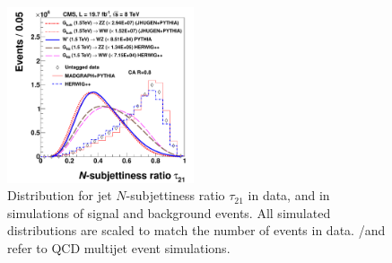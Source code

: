 \begin{figure}[th!b]
\centering
\includegraphics[width=0.49\textwidth]{EventSelectionFigures/signal-data-qcd-Jet-Tau21.pdf}
  \caption{Distribution for jet
   $N$-subjettiness ratio $\tau_{21}$ in data, and in simulations
   of signal and background events. All simulated distributions are
   scaled to match the number of events in data. \MADGRAPH/\PYTHIA and
   \HERWIG{++} refer to QCD multijet event
   simulations.\label{fig:taggingvariables}}
\end{figure}

